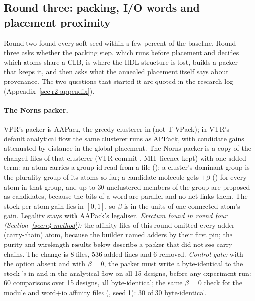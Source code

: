 \subsection{Round three: packing, I/O words and placement proximity}
\label{sec:r3-method}

Round two found every soft seed within a few percent of the baseline. Round three asks whether the
packing step, which runs before placement and decides which atoms share a CLB, is where the HDL
structure is lost, builds a packer that keeps it, and then asks what the annealed placement itself
says about provenance. The two questions that started it are quoted in the research log
(Appendix~\ref{sec:r2-appendix}).

\paragraph{The Norns packer.} VPR's packer is AAPack, the greedy clusterer in  (not
T-VPack); in VTR's default analytical flow the same clusterer runs as APPack, with candidate gains
attenuated by distance in the global placement. The Norns packer is a copy of the changed files of that
clusterer (VTR commit , MIT licence kept) with one added term: an atom carries a group id
read from a file (); a cluster's dominant group is the plurality group of its atoms so
far; a candidate molecule gets $+\beta$ () for every atom in that group, and up
to 30 unclustered members of the group are proposed as candidates, because the bits of a word are parallel and
no net links them. The stock per-atom gain lies in $[0,1]$, so $\beta$ is in the units of one connected atom's
gain. Legality stays with AAPack's legalizer. \emph{Erratum found in round four (Section~\ref{sec:r4-method}):} the affinity files of this round omitted every adder (carry-chain) atom, because the builder named adders by their first pin; the purity and wirelength results below describe a packer that did not see carry chains. The change is 8 files, 536 added lines and 6 removed.
\emph{Control gate:} with the option absent and with $\beta=0$, the packer must write a 
byte-identical to the stock 's in  and in the analytical flow on all 15 designs, before
any experiment run: 60 comparisons over 15 designs, all byte-identical; the same $\beta=0$ check for the module and word+io affinity files (, seed 1): 30 of 30 byte-identical.

